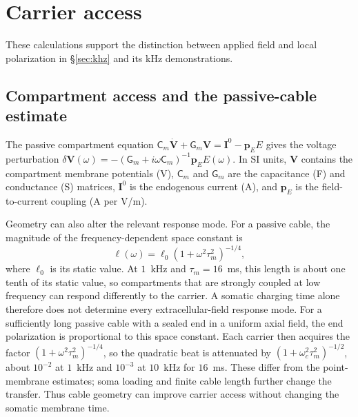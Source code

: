 \section{Carrier access}\label{supp:access}
These calculations support the distinction between applied field and local
polarization in \S\ref{sec:khz} and its kHz demonstrations.
\subsection{Compartment access and the passive-cable estimate}\label{app:access}
The passive compartment equation $\mathsf C_m\dot{\mathbf V}+\mathsf G_m\mathbf V=\mathbf I^0-\mathbf p_EE$
\cite{ruffini2021nmm2} gives the voltage perturbation
$\delta\mathbf V(\omega)=-(\mathsf G_m+i\omega\mathsf C_m)^{-1}\mathbf p_EE(\omega)$. In SI units, $\mathbf V$ contains the compartment membrane potentials (V), $\mathsf C_m$ and
$\mathsf G_m$ are the capacitance (F) and conductance (S) matrices, $\mathbf I^0$ is the
endogenous current (A), and $\mathbf p_E$ is the field-to-current coupling
(A per V/m).

Geometry can also alter the relevant response mode. For a passive cable, the
magnitude of the frequency-dependent space constant is
\begin{equation}
\ell(\omega)=\ell_0(1+\omega^2\tau_m^2)^{-1/4},
\label{eq:lambda}
\end{equation}
where $\ell_0$ is its static value. At $1$~kHz and $\tau_m=16$~ms, this length
is about one tenth of its static value, so compartments that are strongly coupled
at low frequency can respond differently to the carrier. A somatic charging time
alone therefore does not determine every extracellular-field response mode.
For a sufficiently long passive cable with a sealed end in a uniform axial field,
the end polarization is proportional to this space constant. Each carrier then
acquires the factor $(1+\omega^2\tau_m^2)^{-1/4}$, so the quadratic beat is
attenuated by $(1+\omega_c^2\tau_m^2)^{-1/2}$, about $10^{-2}$ at $1$~kHz and
$10^{-3}$ at $10$~kHz for $16$~ms. These differ from the point-membrane estimates;
soma loading and finite cable length further change the transfer.
Thus cable geometry can improve carrier access without changing the somatic
membrane time.


\ifjne

\fi



